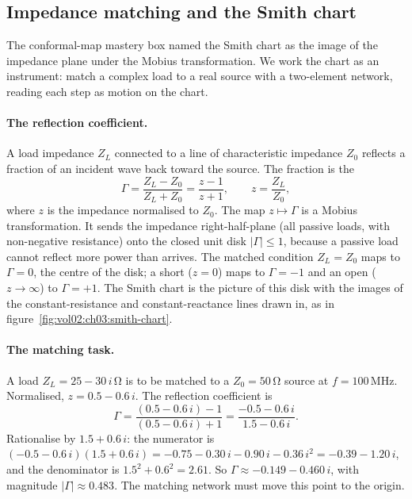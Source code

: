\subsection{Impedance matching and the Smith chart}

The conformal-map mastery box named the Smith chart as the image of the
impedance plane under the Mobius transformation. We work the chart as an
instrument: match a complex load to a real source with a two-element
network, reading each step as motion on the chart.

\paragraph{The reflection coefficient.} A load impedance $Z_{L}$
connected to a line of characteristic impedance $Z_{0}$ reflects a
fraction of an incident wave back toward the source. The fraction is the
\[
\Gamma = \frac{Z_{L} - Z_{0}}{Z_{L} + Z_{0}}
= \frac{z - 1}{z + 1}, \qquad z = \frac{Z_{L}}{Z_{0}},
\]
where $z$ is the impedance normalised to $Z_{0}$. The map $z \mapsto
\Gamma$ is a Mobius transformation. It sends the impedance right-half-plane
(all passive loads, with non-negative resistance) onto the closed unit
disk $|\Gamma| \le 1$, because a passive load cannot reflect more power
than arrives. The matched condition $Z_{L} = Z_{0}$ maps to $\Gamma = 0$,
the centre of the disk; a short ($z = 0$) maps to $\Gamma = -1$ and an
open ($z \to \infty$) to $\Gamma = +1$. The Smith chart is the picture of
this disk with the images of the constant-resistance and
constant-reactance lines drawn in, as in
figure~\ref{fig:vol02:ch03:smith-chart}.

\paragraph{The matching task.} A load $Z_{L} = 25 - 30\,i\,\si{\ohm}$ is
to be matched to a $Z_{0} = 50\,\si{\ohm}$ source at $f = 100\,\si
{\mega\hertz}$. Normalised, $z = 0.5 - 0.6\,i$. The reflection coefficient
is
\[
\Gamma = \frac{(0.5 - 0.6\,i) - 1}{(0.5 - 0.6\,i) + 1}
= \frac{-0.5 - 0.6\,i}{1.5 - 0.6\,i}.
\]
Rationalise by $1.5 + 0.6\,i$: the numerator is $(-0.5 - 0.6\,i)(1.5 +
0.6\,i) = -0.75 - 0.30\,i - 0.90\,i - 0.36\,i^{2} = -0.39 - 1.20\,i$, and
the denominator is $1.5^{2} + 0.6^{2} = 2.61$. So $\Gamma \approx -0.149 -
0.460\,i$, with magnitude $|\Gamma| \approx 0.483$. The matching network
must move this point to the origin.

